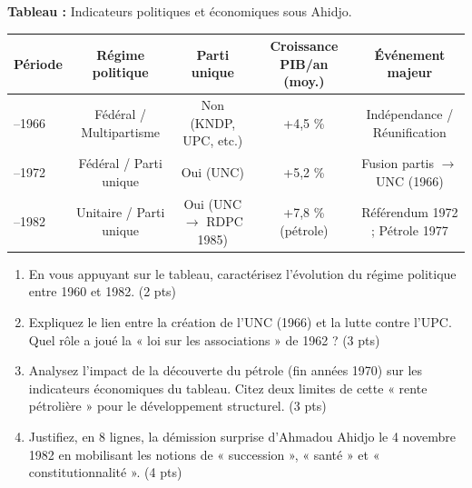 \documentclass[11pt]{article}
\begin{document}
\begin{exercice}
\label{exo:ahidjo}
\textbf{Tableau :} Indicateurs politiques et économiques sous Ahidjo.

\begin{tabularx}{\linewidth}{>{\raggedright\arraybackslash}X c c c c}
\toprule
Période & Régime politique & Parti unique & Croissance PIB/an (moy.) & Événement majeur \\
\midrule
1960--1966 & Fédéral / Multipartisme & Non (KNDP, UPC, etc.) & +4,5 \% & Indépendance / Réunification \\
1966--1972 & Fédéral / Parti unique & Oui (UNC) & +5,2 \% & Fusion partis $\to$ UNC (1966) \\
1972--1982 & Unitaire / Parti unique & Oui (UNC $\to$ RDPC 1985) & +7,8 \% (pétrole) & Référendum 1972 ; Pétrole 1977 \\
\bottomrule
\end{tabularx}

\begin{enumerate}
    \item En vous appuyant sur le tableau, caractérisez l'évolution du régime politique entre 1960 et 1982. (2 pts)
    \item Expliquez le lien entre la création de l'UNC (1966) et la lutte contre l'UPC. Quel rôle a joué la « loi sur les associations » de 1962 ? (3 pts)
    \item Analysez l'impact de la découverte du pétrole (fin années 1970) sur les indicateurs économiques du tableau. Citez deux limites de cette « rente pétrolière » pour le développement structurel. (3 pts)
    \item Justifiez, en 8 lignes, la démission surprise d'Ahmadou Ahidjo le 4 novembre 1982 en mobilisant les notions de « succession », « santé » et « constitutionnalité ». (4 pts)
\end{enumerate}
\end{exercice}
\end{document}
